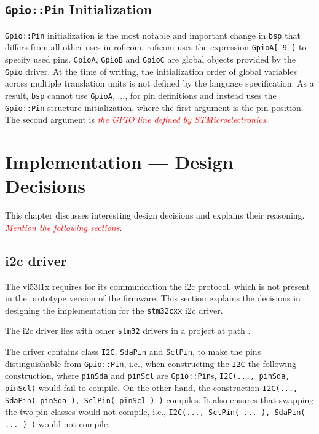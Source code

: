 \documentclass[
  digital,     %
  oneside,     %
  nosansbold,  %
  nocolorbold, %
  nolof,         %
  nolot,         %
]{fithesis4}
\newcommand{\TODO}[1]{\textcolor{red}{\textit{#1}}}
\begin{document}
{{{\section[ Gpio::Pin Initialization ]{ \lstinline|Gpio::Pin| Initialization }
\lstinline{Gpio::Pin} initialization is the most notable and important change in \lstinline{bsp} that differs from all other uses in \acrshort{roficom}. \acrshort{roficom} uses the expression \lstinline{GpioA[ 9 ]} to specify used pins. \lstinline{GpioA}, \lstinline{GpioB} and \lstinline{GpioC} are global objects provided by the \lstinline{Gpio} driver. At the time of writing, the initialization order of global variables across multiple translation units is not defined by the language specification. As a result, \lstinline{bsp} cannot use \lstinline{GpioA}, ..., for pin definitions and instead uses the \lstinline{Gpio::Pin} structure initialization, where the first argument is the pin position. The second argument is \TODO{the GPIO line defined by STMicroelectronics}.

\chapter{ Implementation --- Design Decisions } \label{ch:design}
This chapter discusses interesting design decisions and explains their reasoning. \TODO{Mention the following sections}.

\section[ I2C driver ]{ \acrshort{i2c} driver }

The \gls{vl53l1x} requires for its communication the \acrshort{i2c} protocol, which is not present in the prototype version of the firmware. This section explains the decisions in designing the implementation for the \lstinline|stm32cxx| \acrshort{i2c} driver. 

The \acrshort{i2c} driver lies with other \verb|stm32| drivers in a project at path .

The driver contains class \lstinline|I2C|, \lstinline|SdaPin| and \lstinline|SclPin|, to make the pins distinguishable from \lstinline|Gpio::Pin|, i.e., when constructing the \lstinline|I2C| the following construction, where \lstinline|pinSda| and \lstinline|pinScl| are \lstinline|Gpio::Pin|s, \lstinline|I2C(..., pinSda, pinScl)| would fail to compile. On the other hand, the construction \lstinline|I2C(..., SdaPin( pinSda ), SclPin( pinScl ) )| compiles. It also ensures that swapping the two pin classes would not compile, i.e., \lstinline|I2C(..., SclPin( ... ), SdaPin( ... ) )| would not compile.

}}}
\end{document}
